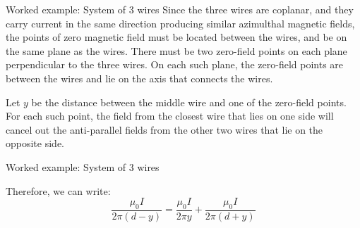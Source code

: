 {\begin{frame}{Worked example: System of 3 wires}
  Since the three wires are coplanar, and they carry current in the same direction
  producing similar azimulthal magnetic fields,
  the points of zero magnetic field must be
  located between the wires, and be on the same plane as the wires.
  There must be two zero-field points on each plane perpendicular to the three wires.
  On each such plane, the zero-field points are between the wires and lie on the
  axis that connects the wires.\\
  \vspace{0.2cm}

  Let $y$ be the distance between the middle wire and one of the zero-field points.
  For each such point, the field from the closest
  wire that lies on one side will cancel out the anti-parallel fields from the
  other two wires that lie on the opposite side.

\end{frame}

%
%
%

\begin{frame}{Worked example: System of 3 wires}

  Therefore, we can write:
  \begin{equation*}
      \frac{\mu_0 I}{2\pi(d-y)} = \frac{\mu_0 I}{2\pi y} + \frac{\mu_0 I}{2\pi(d+y)}
  \end{equation*}


\end{frame}}
